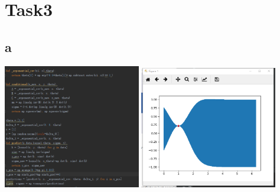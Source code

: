 \documentclass{article}
\begin{document}
\section{Task3}
\subsection{a}
\includegraphics[width=0.45\textwidth]{1596403073(1).png}
\includegraphics[width=0.45\textwidth]{1596402750(1).png}
\end{document}

